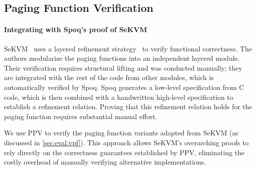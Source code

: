 \subsection{Paging Function Verification}

\paragraph{Integrating with Spoq's proof of SeKVM}
SeKVM~\cite{spoq-artifact} uses a layered refinement strategy~\cite{li:sekvm:usenix21} to verify functional correctness. %
The authors modularize the paging functions into an independent layered module. Their verification requires structural lifting and was conducted manually; they are integrated with the rest of the code from other modules, which is automatically verified by Spoq. Spoq generates a low-level specification from C code, which is then combined with a handwritten high-level specification to establish a refinement relation. Proving that this refinement relation holds for the paging function requires substantial manual effort.

We use PPV to verify the paging function variants adapted from SeKVM (as discussed in \autoref{sec:eval:vpf}). This approach allows SeKVM's overarching proofs to rely directly on the correctness guarantees established by PPV, eliminating the costly overhead of manually verifying alternative implementations.

